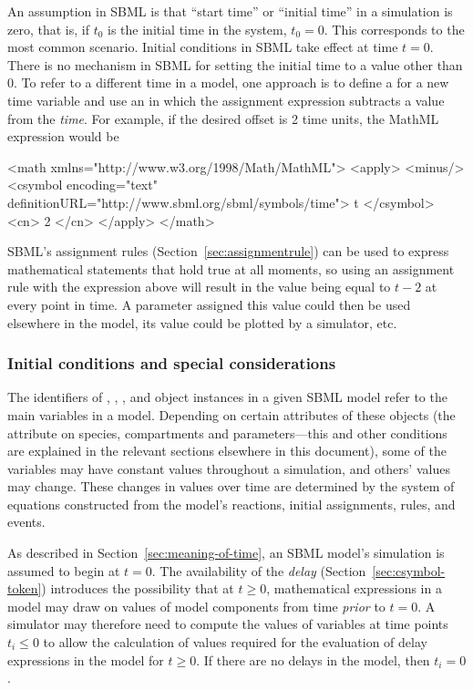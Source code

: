 An assumption in SBML is that ``start time'' or ``initial time''
in a simulation is zero, that is, if $t_0$ is the initial time in
the system, $t_0 = 0$.  This corresponds to the most common
scenario.  Initial conditions in SBML take effect at time $t = 0$.
There is no mechanism in SBML for setting the initial time to a
value other than 0.  To refer to a different time in a model, one
approach is to define a \Parameter for a new time variable and use
an \AssignmentRule in which the assignment expression subtracts a
value from the  \emph{time}.  For example, if the
desired offset is 2 time units, the MathML expression would be

\begin{example}
<math xmlns="http://www.w3.org/1998/Math/MathML">
    <apply>
        <minus/>
        <csymbol encoding="text" definitionURL="http://www.sbml.org/sbml/symbols/time"> t
        </csymbol>
        <cn> 2 </cn>
    </apply>
</math>
\end{example}

SBML's assignment rules (Section~\ref{sec:assignmentrule}) can be
used to express mathematical statements that hold true at all
moments, so using an assignment rule with the expression above
will result in the value being equal to $t - 2$ at every point in
time.  A parameter assigned this value could then be used
elsewhere in the model, its value could be plotted by a simulator,
etc.


\subsubsection{Initial conditions and special considerations}
\label{sec:before-t0}

The identifiers of \Species, \Compartment, \Parameter, and
\Reaction object instances in a given SBML model refer to the main
variables in a model.  Depending on certain attributes of these
objects (\eg the attribute  on species, compartments
and parameters---this and other conditions are explained in the
relevant sections elsewhere in this document), some of the
variables may have constant values throughout a simulation, and
others' values may change.  These changes in values over time are
determined by the system of equations constructed from the model's
reactions, initial assignments, rules, and events.

As described in Section~\ref{sec:meaning-of-time}, an SBML model's
simulation is assumed to begin at $t = 0$.  The availability of
the \emph{delay}  (Section~\ref{sec:csymbol-token})
introduces the possibility that at $t \geq 0$, mathematical
expressions in a model may draw on values of model components from
time \emph{prior} to $t = 0$.  A simulator may therefore need to
compute the values of variables at time points $t_i \leq 0$ to
allow the calculation of values required for the evaluation of
delay expressions in the model for $t \geq 0$.  If there are no
delays in the model, then $t_i = 0$.

